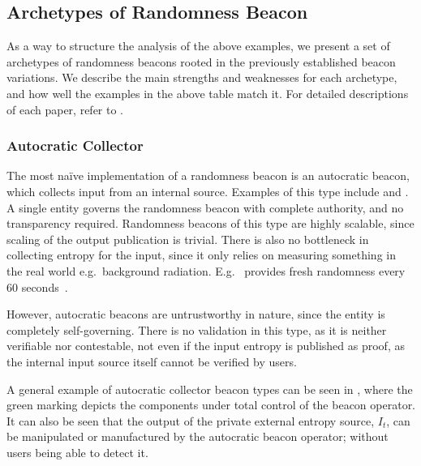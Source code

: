 \subsection{Archetypes of Randomness Beacon}
As a way to structure the analysis of the above examples, we present a set of archetypes of randomness beacons rooted in the previously established beacon variations.
We describe the main strengths and weaknesses for each archetype, and how well the examples in the above table match it.
For detailed descriptions of each paper, refer to .

\subsubsection{Autocratic Collector}\label{ssub:autocratic}
The most naïve implementation of a randomness beacon is an autocratic beacon, which collects input from an internal source.
Examples of this type include  and .
A single entity governs the randomness beacon with complete authority, and no transparency required.
Randomness beacons of this type are highly scalable, since scaling of the output publication is trivial.
There is also no bottleneck in collecting entropy for the input, since it only relies on measuring something in the real world e.g.\ background radiation.
E.g.\  provides fresh randomness every 60 seconds~\cite{nistbeacon}.

However, autocratic beacons are untrustworthy in nature, since the entity is completely self-governing.
There is no validation in this type, as it is neither verifiable nor contestable, not even if the input entropy is published as proof, as the internal input source itself cannot be verified by users.

A general example of autocratic collector beacon types can be seen in , where the green marking depicts the components under total control of the beacon operator.
It can also be seen that the output of the private external entropy source, $I_t$, can be manipulated or manufactured by the autocratic beacon operator; without users being able to detect it.

